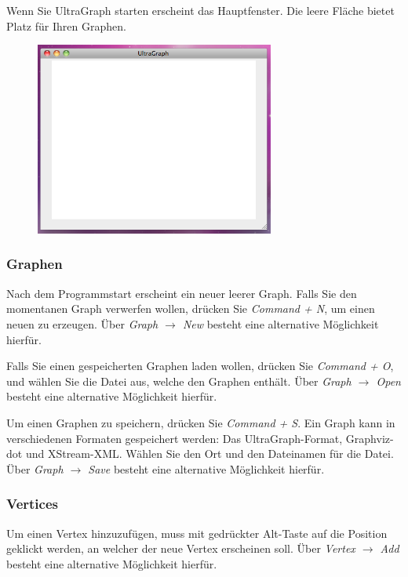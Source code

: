 \documentclass[a4paper,titlepage]{article}
\begin{document}
Wenn Sie UltraGraph starten erscheint das Hauptfenster. Die leere Fläche bietet Platz für Ihren Graphen.

\begin{figure}[ht]
\begin{center}
\includegraphics[width=0.7\textwidth]{screenshot/main_window.png}
\end{center}
\end{figure}

\subsubsection{Graphen}

Nach dem Programmstart erscheint ein neuer leerer Graph. Falls Sie den momentanen Graph verwerfen wollen, drücken Sie \emph{Command + N}, um einen neuen zu erzeugen. Über \emph{Graph $\rightarrow$ New} besteht eine alternative Möglichkeit hierfür.

Falls Sie einen gespeicherten Graphen laden wollen, drücken Sie \emph{Command + O}, und wählen Sie die Datei aus, welche den Graphen enthält. Über \emph{Graph $\rightarrow$ Open} besteht eine alternative Möglichkeit hierfür.

Um einen Graphen zu speichern, drücken Sie \emph{Command + S}. Ein Graph kann in verschiedenen Formaten gespeichert werden: Das UltraGraph-Format, Graphviz-dot und XStream-XML. Wählen Sie den Ort und den Dateinamen für die Datei. Über \emph{Graph $\rightarrow$ Save} besteht eine alternative Möglichkeit hierfür.

\subsubsection{Vertices}

Um einen Vertex hinzuzufügen, muss mit gedrückter Alt-Taste auf die Position geklickt werden, an welcher der neue Vertex erscheinen soll. Über \emph{Vertex $\rightarrow$ Add} besteht eine alternative Möglichkeit hierfür.
\end{document}
